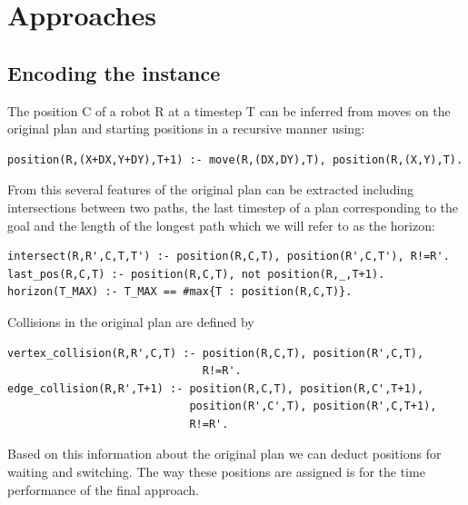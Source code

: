 \documentclass{llncs}
\begin{document}
\newpage

\section{Approaches}

\subsection{Encoding the instance}
The position C of a robot R at a timestep T can be inferred from moves on the original plan and starting positions in a recursive manner using:
\begin{verbatim}
position(R,(X+DX,Y+DY),T+1) :- move(R,(DX,DY),T), position(R,(X,Y),T).  
 \end{verbatim}
From this several features of the original plan can be extracted including intersections between two paths, the last timestep of a plan corresponding to the goal and the length of the longest path which we will refer to as the horizon:
\begin{verbatim}
intersect(R,R',C,T,T') :- position(R,C,T), position(R',C,T'), R!=R'.
last_pos(R,C,T) :- position(R,C,T), not position(R,_,T+1).
horizon(T_MAX) :- T_MAX == #max{T : position(R,C,T)}.
\end{verbatim}
Collisions in the original plan are defined by 
\begin{verbatim}
vertex_collision(R,R',C,T) :- position(R,C,T), position(R',C,T), 
                              R!=R'.
edge_collision(R,R',T+1) :- position(R,C,T), position(R,C',T+1),   
                            position(R',C',T), position(R',C,T+1), 
                            R!=R'.
\end{verbatim}
Based on this information about the original plan we can deduct positions for waiting and switching. The way these positions are assigned is for the time performance of the final approach.
\end{document}
